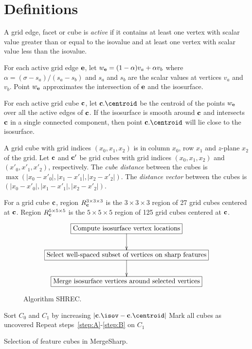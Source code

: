 
\section{Definitions}

A grid edge, facet or cube is {\em active} if it contains at least one vertex 
with scalar value greater than or equal to the isovalue
and at least one vertex with scalar value less than the isovalue.

For each active grid edge $\mathbf{e}$,
let $w_{\mathbf{e}} = (1-\alpha) v_a + \alpha v_b$
where $\alpha = (\sigma - s_a)/(s_a-s_b)$
and $s_a$ and $s_b$ are the scalar values at vertices $v_a$ and $v_b$.
Point $w_{\mathbf{e}}$ approximates the intersection of $\mathbf{e}$ and the isosurface.

For each active grid cube $\mathbf{c}$,
let $\cb.\centroid$ be the centroid of the points $w_{\mathbf{e}}$
over all the active edges of $\mathbf{c}$.
If the isosurface is smooth around $\mathbf{c}$
and intersects $\mathbf{c}$ in a single connected component,
then point $\cb.\centroid$ will lie close to the isosurface.

A grid cube with grid indices $(x_0,x_1,x_2)$ is in column $x_0$, row $x_1$
and $z$-plane $x_2$ of the grid.
Let $\mathbf{c}$ and $\mathbf{c}'$ be grid cubes with grid indices $(x_0,x_1,x_2)$
and $(x'_0,x'_1,x'_2)$, respectively.
The {\em cube distance} between the cubes 
is $\max(|x_0-x'_0|, |x_1-x'_1|, |x_2-x'_2|)$.
The {\em distance vector} between the cubes is
$(|x_0-x'_0|, |x_1-x'_1|, |x_2-x'_2|)$.

For a grid cube $\mathbf{c}$, region $R^{3 \times 3 \times 3}_{\mathbf{c}}$ is the $3 \times 3 \times 3$ region
of 27 grid cubes centered at $\mathbf{c}$.
Region $R^{5 \times 5 \times 5}_{\mathbf{c}}$ is the $5 \times 5 \times 5$ region
of 125 grid cubes centered at $\mathbf{c}$.


\begin{figure}
\begin{equation*}
\xymatrix{
\action{Compute isosurface vertex locations} \ar[d] \\
\action{Select well-spaced subset of vertices on sharp features} \ar[d] \\
\action{Merge isosurface vertices around selected vertices}
}
\end{equation*}
\caption{Algorithm SHREC.}
\label{alg:shrec}
\end{figure}


\begin{algorithm}[t]
Sort $C_0$ and $C_1$ by increasing $|\cb.\isov-\cb.\centroid|$\;
Mark all cubes as uncovered\;
\label{step:B}
Repeat steps~\ref{step:A}-\ref{step:B} on $C_1$\;
\caption{Selection of feature cubes in MergeSharp.}
\label{alg:mergesharp_select}
\end{algorithm}


